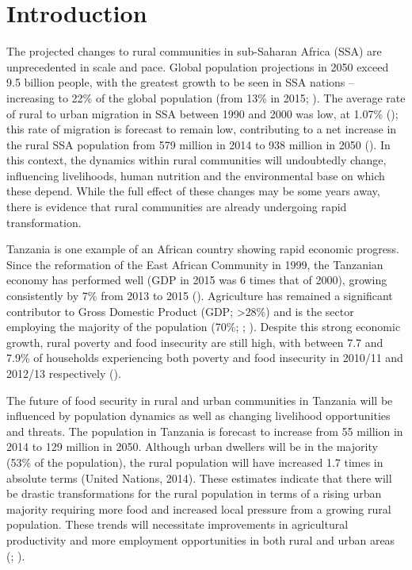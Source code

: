 \newpage

\section{Introduction}

The projected changes to rural communities in sub-Saharan Africa (SSA) are unprecedented in scale and pace. Global population projections in 2050 exceed 9.5 billion people, with the greatest growth to be seen in SSA nations -- increasing to 22\% of the global population (from 13\% in 2015; \citealp{UnitedNations2015}). The average rate of rural to urban migration in SSA between 1990 and 2000 was low, at 1.07\% (\citealp{deBrauw201433}); this rate of migration is forecast to remain low, contributing to a net increase in the rural SSA population from 579 million in 2014 to 938 million in 2050 (\citealp{UnitedNations2014}). In this context, the dynamics within rural communities will undoubtedly change, influencing livelihoods, human nutrition and the environmental base on which these depend. While the full effect of these changes may be some years away, there is evidence that rural communities are already undergoing rapid transformation.

Tanzania is one example of an African country showing rapid economic progress. Since the reformation of the East African Community in 1999, the Tanzanian economy has performed well (GDP in 2015 was 6 times that of 2000), growing consistently by 7\% from 2013 to 2015 (\citealp{NationalBureauofStatisticsTanzaniaNBS2016}). Agriculture has remained a significant contributor to Gross Domestic Product (GDP; {\textgreater}28\%) and is the sector employing the majority of the population (70\%; \citealp{NationalBureauofStatisticsTanzaniaNBS2015}; \citealp{IFAD2016}). Despite this strong economic growth, rural poverty and food insecurity are still high, with between 7.7 and 7.9\% of households experiencing both poverty and food insecurity in 2010/11 and 2012/13 respectively (\citealp{NationalBureauofStatisticsTanzaniaNBS2014}).

The future of food security in rural and urban communities in Tanzania will be influenced by population dynamics as well as changing livelihood opportunities and threats. The population in Tanzania is forecast to increase from 55 million in 2014 to 129 million in 2050. Although urban dwellers will be in the majority (53\% of the population), the rural population will have increased 1.7 times in absolute terms (United Nations, 2014). These estimates indicate that there will be drastic transformations for the rural population in terms of a rising urban majority requiring more food and increased local pressure from a growing rural population. These trends will necessitate improvements in agricultural productivity and more employment opportunities in both rural and urban areas (\citealp{IFAD2016}; \citealp{Jayne2014}).

